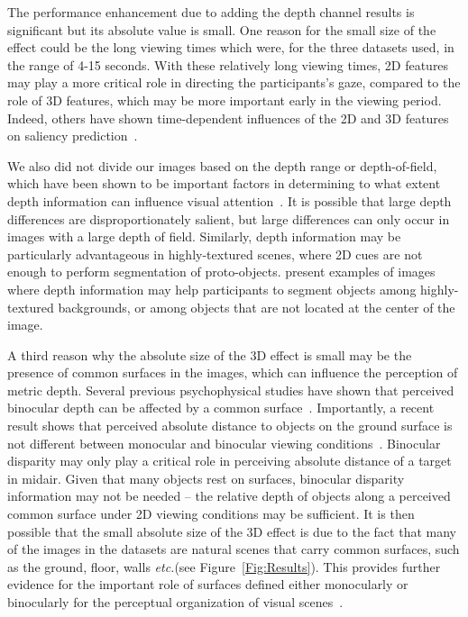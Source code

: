 \documentclass[12pt]{article}
\newcommand{\etc}[0]{{\em etc.}\xspace}
\begin{document}
The performance enhancement due to adding the depth channel results is
significant but its absolute value is small.  One reason for the small
size of the effect could be the long viewing times which were, for
the three datasets used, in the range of 4-15 seconds. With these
relatively long viewing times, 2D features may play a more critical
role in directing the participants's gaze, compared to the role of 3D
features, which may be more important early in the viewing
period. Indeed, others have shown time-dependent influences of the 2D
and 3D features on saliency prediction~\citep{Gautier_LeMeur12}.

We also did not divide our images based on the depth range or
depth-of-field, which have been shown to be important factors in
determining to what extent depth information can influence visual
attention~\citep{Lang_etal12}. It is possible that large
depth differences are disproportionately salient, but large
differences can only occur in images with a large depth of field.
Similarly, depth information may be particularly advantageous in
highly-textured scenes, where 2D cues are not enough to perform
segmentation of proto-objects. \cite{Ma_Hang15} present examples of
images where depth information may help participants to segment
objects among highly-textured backgrounds, or among objects that are
not located at the center of the image.

A third reason why the absolute size of the 3D effect is small may be
the presence of common surfaces in the images, which can influence the
perception of metric depth. Several previous psychophysical studies
have shown that perceived binocular depth can be affected by a common
surface~\citep{McKee_83,Glennerster_McKee99,He_Ooi00}. Importantly, a
recent result shows that perceived absolute distance to objects on the
ground surface is not different between monocular and binocular
viewing conditions~\citep{Ooi_He15}. Binocular disparity may only play a
critical role in perceiving absolute distance of a target in midair.
Given that many objects rest on surfaces, binocular disparity information may not
be needed -- the relative depth of objects along a perceived common
surface under 2D viewing conditions may be sufficient. It is then
possible that the small absolute size of the 3D effect is due to the
fact that many of the images in the datasets are natural scenes that
carry common surfaces, such as the ground, floor, walls \etc (see
Figure~\ref{Fig:Results}). This provides further evidence for the
important role of surfaces defined either monocularly or binocularly
for the perceptual organization of visual
scenes~\citep{He_Nakayama92,He_Nakayama95,Hu_etal15a}.
\end{document}
